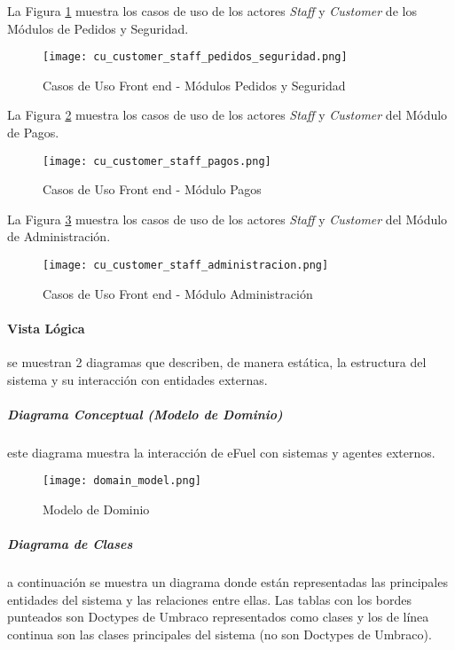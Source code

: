 \newpage
La Figura \ref{fig:cu_customer_staff_pedidos} muestra los casos de uso de los actores \textit{Staff} y \textit{Customer} de los Módulos de Pedidos y Seguridad.
\begin{figure}[H]
    \centering
    \texttt{[image: cu\_customer\_staff\_pedidos\_seguridad.png]}
    \caption{Casos de Uso Front end - Módulos Pedidos y Seguridad}
    \label{fig:cu_customer_staff_pedidos}
\end{figure}
\vspace*{\fill}

\newpage
La Figura \ref{fig:cu_customer_staff_pagos} muestra los casos de uso de los actores \textit{Staff} y \textit{Customer} del Módulo de Pagos.
\begin{figure}[H]
    \centering
    \texttt{[image: cu\_customer\_staff\_pagos.png]}
    \caption{Casos de Uso Front end - Módulo Pagos}
    \label{fig:cu_customer_staff_pagos}
\end{figure}
\vspace*{\fill}

\newpage
La Figura \ref{fig:cu_customer_staff_administracion} muestra los casos de uso de los actores \textit{Staff} y \textit{Customer} del Módulo de Administración.
\begin{figure}[H]
    \centering
    \texttt{[image: cu\_customer\_staff\_administracion.png]}
    \caption{Casos de Uso Front end - Módulo Administración}
    \label{fig:cu_customer_staff_administracion}
\end{figure}

\newpage
\paragraph{Vista Lógica} se muestran 2 diagramas que describen, de manera estática, la estructura del sistema y su interacción con entidades externas.

\subparagraph*{Diagrama Conceptual (Modelo de Dominio)} este diagrama muestra la interacción de eFuel con sistemas y agentes externos.
\begin{figure}[H]
    \texttt{[image: domain\_model.png]}
    \caption{Modelo de Dominio}
    \label{fig:domain_model}
    \centering
\end{figure}

\subparagraph*{Diagrama de Clases} a continuación se muestra un diagrama donde están representadas las principales entidades del sistema y las relaciones entre ellas. Las tablas con los bordes punteados son Doctypes de Umbraco representados como clases y los de línea continua son las clases principales del sistema (no son Doctypes de Umbraco).


